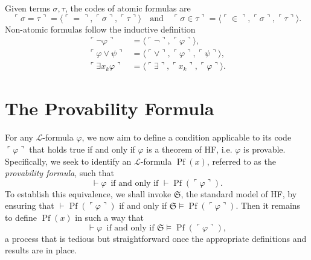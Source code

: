\begin{definition}
    \label{def:Code.Formula}
    \leanok
    Given terms $\sigma, \tau$, the codes of atomic formulas are
    $$
    \ulcorner{\sigma = \tau}\urcorner = 
    \langle\ulcorner{=}\urcorner, \ulcorner{\sigma}\urcorner, \ulcorner{\tau}\urcorner \rangle
    \quad \text{and} \quad
    \ulcorner{\sigma \in \tau}\urcorner = 
    \langle\ulcorner{\in}\urcorner, \ulcorner{\sigma}\urcorner, \ulcorner{\tau}\urcorner \rangle.
    $$
    Non-atomic formulas follow the inductive definition
    $$
    \begin{aligned}
        \ulcorner{\neg\varphi}\urcorner & = 
        \langle\ulcorner{\neg}\urcorner, \ulcorner{\varphi}\urcorner \rangle, \\
        \ulcorner{\varphi \lor \psi}\urcorner & = 
        \langle\ulcorner{\lor}\urcorner, \ulcorner{\varphi}\urcorner, 
        \ulcorner{\psi}\urcorner \rangle, \\
        \ulcorner{\exists x_k \varphi}\urcorner & = 
        \langle\ulcorner{\exists}\urcorner, \ulcorner{x_k}\urcorner, 
        \ulcorner{\varphi}\urcorner \rangle.
    \end{aligned}
    $$
\end{definition}



\chapter{The Provability Formula}

For any $\mathcal{L}$-formula $\varphi$, we now aim to define a condition applicable to
its code $\ulcorner\varphi\urcorner$ that holds true if and only if $\varphi$ is a theorem of HF, 
i.e. $\varphi$ is provable. 
Specifically, we seek to identify an $\mathcal{L}$-formula $\operatorname{Pf}(x)$,
referred to as the \textit{provability formula}, such that
$$
\vdash \varphi \,\text{ if and only if } \vdash \operatorname{Pf}(\ulcorner{\varphi}\urcorner).
$$
To establish this equivalence, we shall invoke $\mathfrak{S}$, the standard model of HF,
by ensuring that $\vdash \operatorname{Pf}(\ulcorner{\varphi}\urcorner)$ if and only if
$\mathfrak{S} \vDash \operatorname{Pf}(\ulcorner{\varphi}\urcorner)$. 
Then it remains to define $\operatorname{Pf}(x)$ in such a way that
$$
\vdash \varphi \,\text{ if and only if } 
\mathfrak{S} \vDash \operatorname{Pf}(\ulcorner{\varphi}\urcorner),
$$
a process that is tedious but straightforward once the appropriate definitions and results 
are in place.

